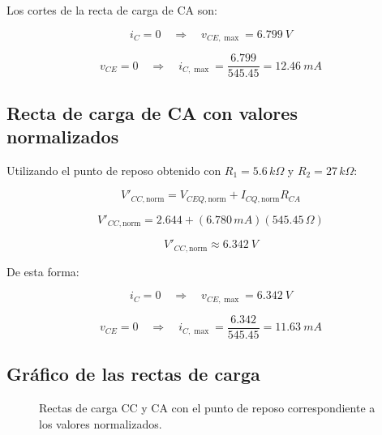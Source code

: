 \documentclass[a4paper,12pt]{article}
\begin{document}
Los cortes de la recta de carga de CA son:

\[
i_C=0
\quad\Rightarrow\quad
v_{CE,\max}
=
\boxed{\SI{6.799}{V}}
\]

\[
v_{CE}=0
\quad\Rightarrow\quad
i_{C,\max}
=
\frac{6.799}{545.45}
=
\boxed{\SI{12.46}{mA}}
\]

\subsection{Recta de carga de CA con valores normalizados}

Utilizando el punto de reposo obtenido con $R_1=5.6\,k\Omega$ y $R_2=27\,k\Omega$:

\[
V'_{CC,\mathrm{norm}}
=
V_{CEQ,\mathrm{norm}}
+
I_{CQ,\mathrm{norm}}R_{CA}
\]

\[
V'_{CC,\mathrm{norm}}
=
2.644
+
(6.780\,mA)(545.45\,\Omega)
\]

\[
\boxed{V'_{CC,\mathrm{norm}}\approx\SI{6.342}{V}}
\]

De esta forma:

\[
i_C=0
\quad\Rightarrow\quad
v_{CE,\max}
=
\SI{6.342}{V}
\]

\[
v_{CE}=0
\quad\Rightarrow\quad
i_{C,\max}
=
\frac{6.342}{545.45}
=
\boxed{\SI{11.63}{mA}}
\]

\subsection{Gráfico de las rectas de carga}

\begin{figure}[H]
\centering
{}
\caption{Rectas de carga CC y CA con el punto de reposo correspondiente a los valores normalizados.}
\end{figure}
\end{document}
